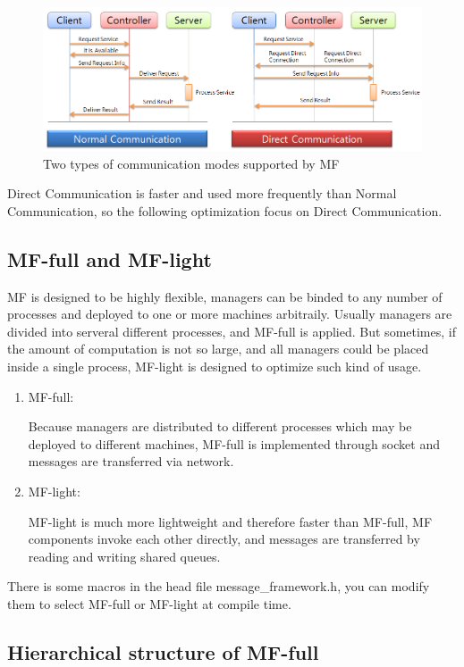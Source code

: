 \documentclass[a4paper,10pt]{article}
\begin{document}
\begin{figure}[!ht]\centering
  \includegraphics[width=1.00\textwidth]{mf_1.png}
  \caption{Two types of communication modes supported by MF}\label{fig:mf_orig}
\end{figure}

Direct Communication is faster and used more frequently than Normal Communication, so the following optimization focus on Direct Communication.

\subsection{MF-full and MF-light}

MF is designed to be highly flexible, managers can be binded to any number of processes and deployed to one or more machines arbitraily.
Usually managers are divided into serveral different processes, and MF-full is applied.
But sometimes, if the amount of computation is not so large, and all managers could be placed inside a single process, MF-light is designed to optimize such kind of usage.
\begin{enumerate}
\item{MF-full:}

Because managers are distributed to different processes which may be deployed to different machines, MF-full is implemented through socket and messages are transferred via network.
\item{MF-light:}

MF-light is much more lightweight and therefore faster than MF-full, MF components invoke each other directly, and messages are transferred by reading and writing shared queues.
\end{enumerate}
There is some macros in the head file message\_framework.h, you can modify them to select MF-full or MF-light at compile time.

\subsection{Hierarchical structure of MF-full}
\end{document}

